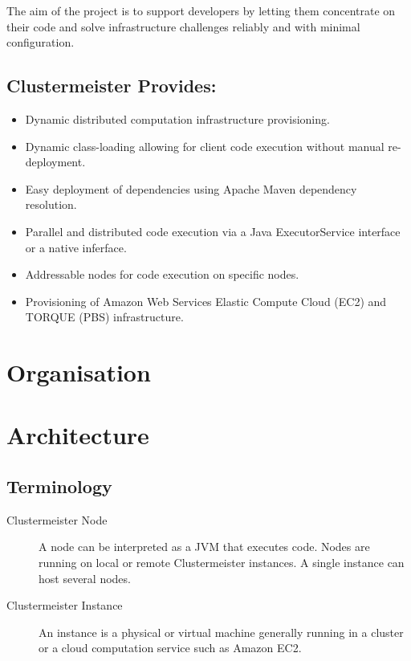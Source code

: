 \documentclass[english]{uzhpub}
\begin{document}
The aim of the project is to support developers by letting them concentrate on their code and solve infrastructure challenges reliably and with minimal configuration.

\subsection*{Clustermeister Provides:}
\begin{itemize}
\item Dynamic distributed computation infrastructure provisioning.
\item Dynamic class-loading allowing for client code execution without manual re-deployment.
\item Easy deployment of dependencies using Apache Maven dependency resolution.
\item Parallel and distributed code execution via a Java ExecutorService interface or a native inferface.
\item Addressable nodes for code execution on specific nodes.
\item Provisioning of Amazon Web Services Elastic Compute Cloud (EC2) and TORQUE (PBS) infrastructure.
\end{itemize}

\section{Organisation}



\section{Architecture}

\subsection{Terminology}

\begin{description}
\item[Clustermeister Node] A node can be interpreted as a JVM that executes code. Nodes are running on local or remote Clustermeister instances. A single instance can host several nodes.
\item[Clustermeister Instance] An instance is a physical or virtual machine generally running in a cluster or a cloud computation service such as Amazon EC2.
\end{description}
\end{document}
